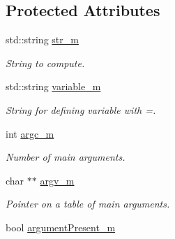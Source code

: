 \subsection*{Protected Attributes}
\begin{DoxyCompactItemize}
\item 
\hypertarget{class_application_a6b854bee68b76d31b8b2fb3e8d718e93}{}std\+::string \hyperlink{class_application_a6b854bee68b76d31b8b2fb3e8d718e93}{str\+\_\+m}\label{class_application_a6b854bee68b76d31b8b2fb3e8d718e93}

\begin{DoxyCompactList}\small\item\em String to compute. \end{DoxyCompactList}\item 
\hypertarget{class_application_ab7e7426198ded50eb9ba3b6ce15b43d4}{}std\+::string \hyperlink{class_application_ab7e7426198ded50eb9ba3b6ce15b43d4}{variable\+\_\+m}\label{class_application_ab7e7426198ded50eb9ba3b6ce15b43d4}

\begin{DoxyCompactList}\small\item\em String for defining variable with =. \end{DoxyCompactList}\item 
\hypertarget{class_application_ad1899c23670e3e62d65c79d2b5cab185}{}int \hyperlink{class_application_ad1899c23670e3e62d65c79d2b5cab185}{argc\+\_\+m}\label{class_application_ad1899c23670e3e62d65c79d2b5cab185}

\begin{DoxyCompactList}\small\item\em Number of main arguments. \end{DoxyCompactList}\item 
\hypertarget{class_application_aab5c326977c668262c049dadc87c09d3}{}char $\ast$$\ast$ \hyperlink{class_application_aab5c326977c668262c049dadc87c09d3}{argv\+\_\+m}\label{class_application_aab5c326977c668262c049dadc87c09d3}

\begin{DoxyCompactList}\small\item\em Pointer on a table of main arguments. \end{DoxyCompactList}\item 
\hypertarget{class_application_a09431f64a225af0307dc85797f5275bb}{}bool \hyperlink{class_application_a09431f64a225af0307dc85797f5275bb}{argument\+Present\+\_\+m}\label{class_application_a09431f64a225af0307dc85797f5275bb}


\end{DoxyCompactItemize}
